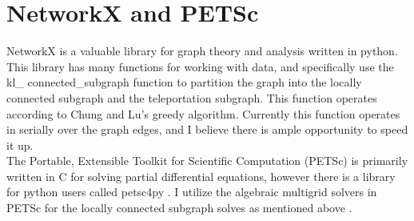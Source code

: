 \documentclass{article}
\begin{document}
\section{NetworkX and PETSc}
NetworkX is a valuable library for graph theory and analysis written in python. This library has many functions for working with data, and specifically use the kl\_ connected\_subgraph function to partition the graph into the locally connected subgraph and the teleportation subgraph. \cite{Hagberg:2008} This function operates according to Chung and Lu's greedy algorithm. Currently this function operates in serially over the graph edges,  and I believe there is ample opportunity to speed it up.\\
The Portable, Extensible Toolkit for Scientific Computation (PETSc) is primarily written in C for solving partial differential equations, however there is a library for python users called petsc4py \cite{Dalcin:2011}. I utilize the algebraic multigrid solvers in PETSc for the locally connected subgraph solves as mentioned above \cite{petsc-user-ref}.








\end{document}
